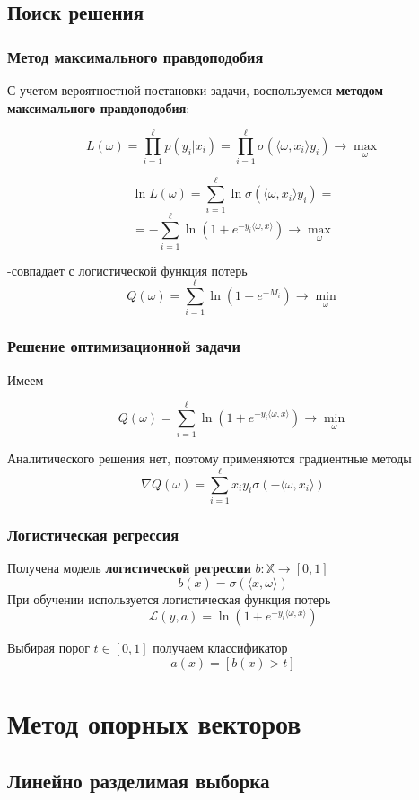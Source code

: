 \documentclass{beamer}
\begin{document}
	\subsection{Поиск решения}
	
	\begin{frame}
		\frametitle{Метод максимального правдоподобия}
		С учетом вероятностной постановки задачи, воспользуемся \textbf{методом максимального правдоподобия}:
		
		\[
		L(\omega) = \prod_{i=1}^{\ell} p(y_i | x_i) = 
		\prod_{i=1}^{\ell} \sigma(\langle \omega, x_i \rangle y_i)
		\rightarrow \max_{\omega}
		\]
		
		\[
		\ln L(\omega) 
		= \sum_{i=1}^{\ell} \ln \sigma(\langle \omega, x_i \rangle y_i)
		=
		\]
		\[
		= 
		- \sum_{i=1}^{\ell} \ln(1 + e^{-y_i \langle \omega, x \rangle}) \rightarrow \max_{\omega}
		\]
		
		-совпадает с логистической функция потерь 
		\[
		Q(\omega) = \sum_{i=1}^{\ell} \ln (1 + e^{-M_i}) \rightarrow \min_{\omega}
		\]
	\end{frame}
	
	\begin{frame}
		\frametitle{Решение оптимизационной задачи}
		Имеем
		
		\[
		Q(\omega) = \sum_{i=1}^{\ell} \ln (1 + e^{- y_i \langle \omega, x \rangle}) \rightarrow \min_{\omega}
		\]
		
		Аналитического решения нет, поэтому применяются градиентные методы
		\[
		\nabla Q(\omega) = \sum_{i=1}^{\ell} x_i y_i \sigma(- \langle \omega, x_i \rangle)
		\]
	\end{frame}
	
	\begin{frame}
		\frametitle{Логистическая регрессия}
		Получена модель \textbf{логистической регрессии} $b: \mathbb{X} \rightarrow [0, 1]$
		\[
		b(x) = \sigma(\langle x, \omega \rangle)
		\]
		При обучении используется логистическая функция потерь
		\[
		\mathcal{L}(y, a) = \ln(1 + e^{-y_i \langle \omega, x \rangle})
		\]
		
		Выбирая порог $t \in [0, 1]$ получаем классификатор
		\[
		a(x) = [b(x) > t]
		\]
		
	\end{frame}
	
	\section{Метод опорных векторов}
	
	\subsection{Линейно разделимая выборка}
	
\end{document}
